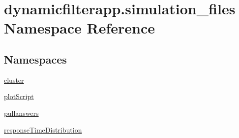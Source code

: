 \hypertarget{namespacedynamicfilterapp_1_1simulation__files}{}\section{dynamicfilterapp.\+simulation\+\_\+files Namespace Reference}
\label{namespacedynamicfilterapp_1_1simulation__files}
\subsection*{Namespaces}
\begin{DoxyCompactItemize}
\item 
 \hyperlink{namespacedynamicfilterapp_1_1simulation__files_1_1cluster}{cluster}
\item 
 \hyperlink{namespacedynamicfilterapp_1_1simulation__files_1_1plot_script}{plot\+Script}
\item 
 \hyperlink{namespacedynamicfilterapp_1_1simulation__files_1_1pullanswers}{pullanswers}
\item 
 \hyperlink{namespacedynamicfilterapp_1_1simulation__files_1_1response_time_distribution}{response\+Time\+Distribution}
\end{DoxyCompactItemize}
